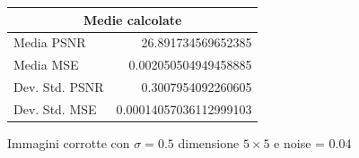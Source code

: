 \begin{figure}[H]
\begin{minipage}[h]{0.4\textwidth}
{\begin{tabular}{|lr|}
            \multicolumn{2}{|c|}{\textbf{Medie calcolate}} \\ \hline
            Media PSNR           & 26.891734569652385           \\
            Media MSE            & 0.002050504949458885        \\
            Dev. Std. PSNR       & 0.3007954092260605           \\
            Dev. Std. MSE        & 0.00014057036112999103       \\ \hline
            \end{tabular}
        }
    \end{minipage}
    \captionsetup{labelformat=andtable}
    \caption{Immagini corrotte con $\sigma = 0.5$ dimensione $5 \times 5$ e noise = 0.04}
\end{figure}

